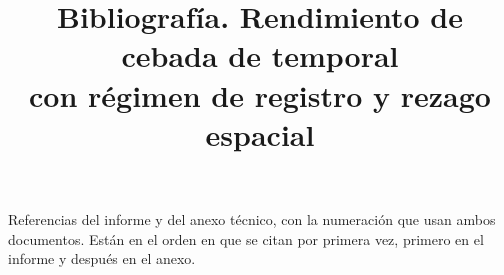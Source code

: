 \documentclass[conference,letterpaper]{IEEEtran}
\begin{document}
\title{Bibliografía. Rendimiento de cebada de temporal\\con régimen de registro y rezago espacial}

\author{
}

\maketitle

Referencias del informe y del anexo técnico, con la numeración que usan ambos documentos. Están en el orden en que se
citan por primera vez, primero en el informe y después en el anexo.


\end{document}

